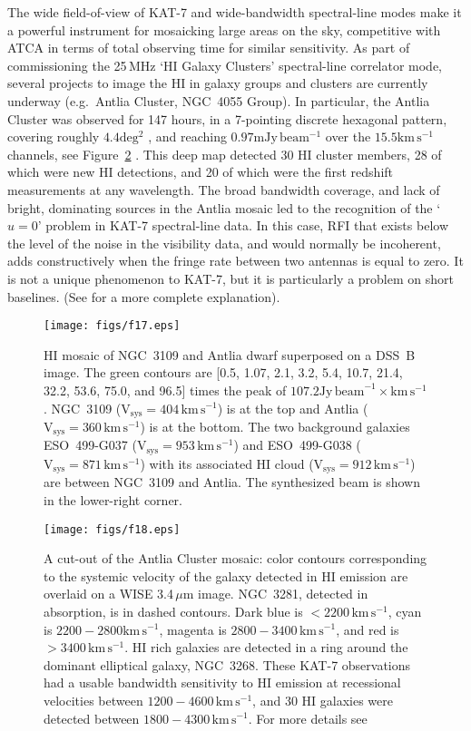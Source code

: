 The wide field-of-view of KAT-7 and wide-bandwidth spectral-line modes
make it a powerful instrument for mosaicking large areas on the sky,
competitive with ATCA in terms of total observing time for similar
sensitivity.  As part of commissioning the 25\,MHz `HI Galaxy
Clusters' spectral-line correlator mode, several projects
to image the HI in galaxy groups and clusters are currently underway
(e.g.~Antlia Cluster, NGC~4055 Group). In particular, the Antlia
Cluster was observed for 147 hours, in a 7-pointing discrete hexagonal
pattern, covering roughly $4.4\mathrm{deg^2}$ , and reaching 
$0.97 \mathrm{mJy \,beam^{-1}}$
over the $15.5 \mathrm{km \,s^{-1}}$ channels, see Figure~\ref{fig:antlia2} \citealt{hess}.  This deep map detected 30 HI cluster members, 28 of
which were new HI detections, and 20 of which were the first redshift
measurements at any wavelength.  The broad bandwidth coverage, and
lack of bright, dominating sources in the Antlia mosaic led to the
recognition of the `$u=0$' problem in KAT-7 spectral-line data.  In
this case, RFI that exists below the level of the noise in the
visibility data, and would normally be incoherent, adds constructively
when the fringe rate between two antennas is equal to zero.  It is not
a unique phenomenon to KAT-7, but it is particularly a problem on
short baselines.  (See \citealt{hess} for a more complete explanation).

\begin{figure}
\texttt{[image: figs/f17.eps]}
\caption{HI mosaic of NGC~3109 and Antlia dwarf superposed on a
 DSS~B image. The green contours are [0.5, 1.07, 2.1, 3.2, 5.4,
 10.7, 21.4, 32.2, 53.6, 75.0, and 96.5] times the peak of 
 $107.2 \mathrm{Jy \,{beam}^{-1} \times km \,s^{-1}}$.
 NGC~3109 ($\mathrm{V_{sys}  = 404 \,km\, s^{-1}}$) is at the
 top and Antlia ($\mathrm{V_{sys} = 360 \,km\,s^{-1}}$) is at the bottom. The two
 background galaxies ESO~499-G037 ($\mathrm{V_{sys}  = 953\, km \,s^{-1}}$) and
 ESO~499-G038 ($\mathrm{V_{sys} = 871\, km \, s^{-1}}$) with its associated HI cloud
 ($\mathrm{V_{sys} = 912 \,km \,s^{-1}}$) are between NGC~3109 and Antlia. The
 synthesized beam is shown in the lower-right corner.}
\label{fig:ngc3109}
\end{figure}

\begin{figure}
\texttt{[image: figs/f18.eps]}
\caption{A cut-out of the Antlia Cluster mosaic: color contours
  corresponding to the systemic velocity of the galaxy detected in HI
  emission are overlaid on a WISE 3.4\,$\mu$m image. NGC~3281,
  detected in absorption, is in dashed contours.  Dark blue is
  $\mathrm{<2200 \,km \, s^{-1}}$, cyan is $\mathrm{2200-2800 km
    \,s^{-1}}$, magenta is $\mathrm{2800-3400 \,km \,s^{-1}}$, and red
  is $\mathrm{>3400 \,km\, s^{-1}}$.  HI rich galaxies are detected in
  a ring around the dominant elliptical galaxy, NGC~3268. These KAT-7
  observations had a usable bandwidth sensitivity to HI emission at
  recessional velocities between $\mathrm{1200-4600 \,km \,s^{-1}}$,
  and 30 HI galaxies were detected between $\mathrm{1800-4300 \,km
    \,s^{-1}}$.  For more details see \citealt{hess}}
\label{fig:antlia2}
\end{figure}

